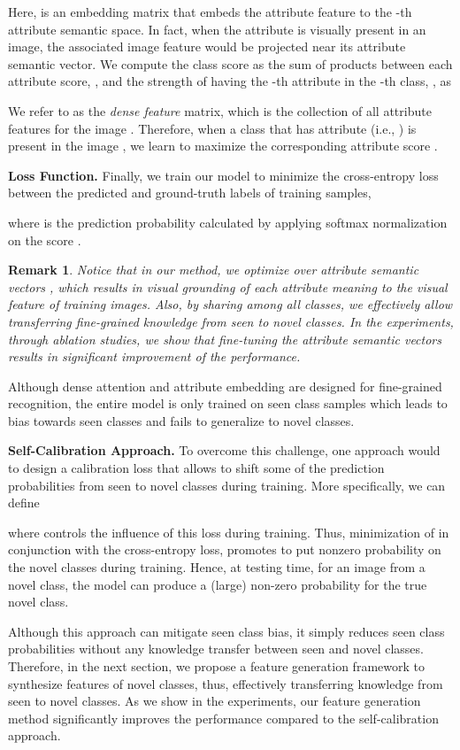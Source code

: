 \documentclass[10pt,journal,compsoc]{IEEEtran}
\newcommand{\1}{\boldsymbol{1}}
\newcommand{\0}{\boldsymbol{0}}
\newcommand{\<}{\langle}
\renewcommand{\>}{\rangle}
\newtheorem{remark}{Remark}
\newcommand{\myparagraph}[1]{\vspace{-2pt}\medskip\noindent\textbf{#1}}
\begin{document}
Here,  is an embedding matrix that embeds the attribute feature  to the -th attribute semantic space. In fact, when the attribute is visually present in an image, the associated image feature would be projected near its attribute semantic vector. We compute the class score as the sum of products between each attribute score, , and the strength of having the -th attribute in the -th class, , as

We refer to  as the \emph{dense feature} matrix, which is the collection of all attribute features for the image . Therefore, when a class  that has attribute  (i.e., ) is present in the image , we learn to maximize the corresponding attribute score .

\myparagraph{Loss Function.}
Finally, we train our model to minimize the cross-entropy loss between the predicted and ground-truth labels of training samples,

where  is the prediction probability calculated by applying softmax normalization on the score . 
\begin{remark}
Notice that in our method, we optimize over attribute semantic vectors , which results in visual grounding of each attribute meaning to the visual feature of training images. Also, by sharing  among all classes, we effectively allow transferring fine-grained knowledge from seen to novel classes. In the experiments, through ablation studies, we show that fine-tuning the attribute semantic vectors results in significant improvement of the performance.
\end{remark}


Although dense attention and attribute embedding are designed for fine-grained recognition, the entire model is only trained on seen class samples which leads to bias towards seen classes and fails to generalize to novel classes.

\myparagraph{Self-Calibration Approach.}
To overcome this challenge, one approach would to design a calibration loss that allows to shift some of the prediction probabilities from seen to novel classes during training. More specifically, we can define

where  controls the influence of this loss during training.
Thus, minimization of  in conjunction with the cross-entropy loss, promotes to put nonzero probability on the novel classes during training.
Hence, at testing time, for an image from a novel class, the model can produce a (large) non-zero probability for the true novel class.  

Although this approach can mitigate seen class bias, it simply reduces seen class probabilities without any knowledge transfer between seen and novel classes. Therefore, in the next section, we propose a feature generation framework to synthesize features of novel classes, thus, effectively transferring knowledge from seen to novel classes. As we show in the experiments, our feature generation method significantly improves the performance compared to the self-calibration approach.
\end{document}
